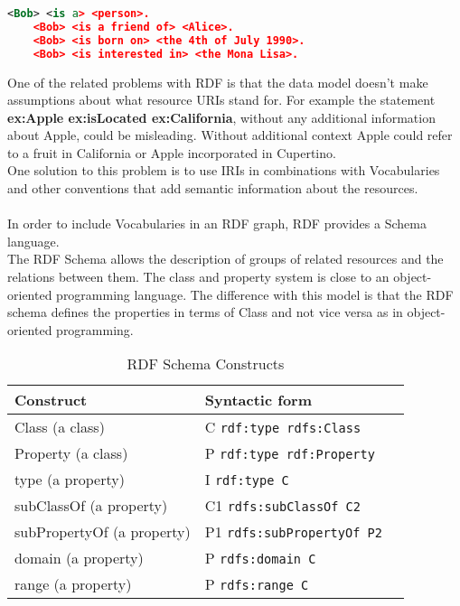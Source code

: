 \begin{lstlisting}[language=XML, caption={RDF Grouped Data}, label={lst:xml-rdf-grouped-example}]
	<Bob> <is a> <person>.
	<Bob> <is a friend of> <Alice>.
	<Bob> <is born on> <the 4th of July 1990>.
	<Bob> <is interested in> <the Mona Lisa>.
\end{lstlisting}
One of the related problems with RDF is that the data model doesn't make assumptions about what resource URIs stand for.
For example the statement \space \textbf{ex:Apple ex:isLocated ex:California}, without any additional information about Apple, could be misleading. Without additional context Apple could refer to a fruit in California or Apple incorporated in Cupertino.
\\
One solution to this problem is to use IRIs in combinations with Vocabularies and other conventions that add semantic information about the resources.
\\
\\
In order to include Vocabularies in an RDF graph, RDF provides a Schema language.
\\
The RDF Schema allows the description of groups of related resources and the relations between them.
The class and property system is close to an object-oriented programming language. The difference with this model is that the RDF schema defines the properties in terms of Class and not vice versa as in object-oriented programming.
\begin{table}[h]
    \centering
    \begin{tabular}{lll}
        \toprule
        \textbf{Construct} & \textbf{Syntactic form} \\
        \midrule
        Class (a class) & C \texttt{rdf:type rdfs:Class}  \\
        Property (a class) & P \texttt{rdf:type rdf:Property} \\
        type (a property) & I \texttt{rdf:type C} \\
        subClassOf (a property) & C1 \texttt{rdfs:subClassOf C2} \\
        subPropertyOf (a property) & P1 \texttt{rdfs:subPropertyOf P2} \\
        domain (a property) & P \texttt{rdfs:domain C} \\
        range (a property) & P \texttt{rdfs:range C} \\
        \bottomrule
    \end{tabular}
    \caption{RDF Schema Constructs}
    \label{tab:rdf_schema_constructs}
\end{table}

